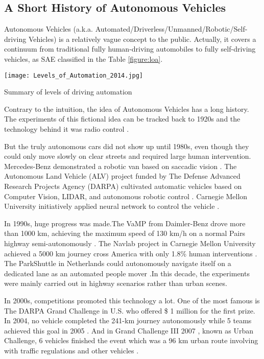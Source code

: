 \subsection{A Short History of Autonomous Vehicles}

Autonomous Vehicles (a.k.a. Automated/Driverless/Unmanned/Robotic/Self-driving Vehicles) is a relatively vague concept to the public. Actually, it covers a continuum  from traditional fully human-driving automobiles to fully self-driving vehicles, as SAE classified in the Table \ref{figure:loa}.

\begin{table}[h]		
	\texttt{[image: Levels\_of\_Automation\_2014.jpg]}
	\caption{Summary of levels of driving automation\cite{J3016_201401}}
	\centering
	\label{figure:loa}
\end{table}

Contrary to the intuition, the idea of Autonomous Vehicles has a long history. The experiments of this fictional idea can be tracked back to 1920s and the technology behind it was radio control \cite{pawtc}. 

But the truly autonomous cars did not show up until 1980s, even though they could only move slowly on clear streets and required large human intervention. Mercedes-Benz demonstrated a robotic van based on saccadic vision \cite{schj}. The Autonomous Land Vehicle (ALV) project funded by The Defense Advanced Research Projects Agency (DARPA) cultivated automatic vehicles based on Computer Vision, LIDAR, and autonomous robotic control \cite{Kanade:1986:ALV:324634.325197}. Carnegie Mellon University initiatively applied neural network to control the vehicle \cite{NIPS1988_95}. 

In 1990s, huge progress was made.The VaMP from Daimler-Benz drove more than 1000 km, achieving the maximum speed of 130 km/h on a normal Pairs highway semi-autonomously \cite{schj}. The Navlab project in Carnegie Mellon University achieved a 5000 km  journey cross America with only 1.8\% human interventions \cite{nohand}. The ParkShuttle in Netherlands could autonomously navigate itself on a dedicated lane as an automated people mover \cite{parkshuttle}.In this decade, the experiments were mainly carried out in highway scenarios rather than urban scenes.

In 2000s, competitions promoted this technology a lot. One of the most famous is The DARPA Grand Challenge in U.S. who offered \$ 1 million for the first prize. In 2004, no vehicle completed the 241-km journey autonomously while 5 teams achieved this goal in 2005 \cite{Buehler2007}. And in Grand Challenge III 2007 , known as Urban Challenge, 6 vehicles  finished the event which was a 96 km urban route involving with traffic regulations and other vehicles \cite{Buehler2009}.

